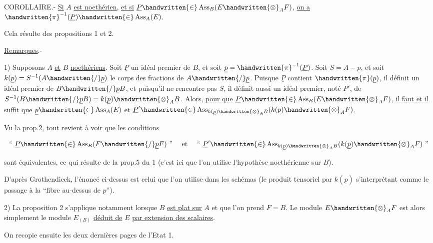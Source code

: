 COROLLAIRE.- \uline{Si} $A$ \uline{est noethérien}, \uline{et si} $\underline P\handwritten{\in}\operatorname{Ass}_B(E\handwritten{\otimes}_A F)$, \uline{on a} $\handwritten{\pi}^{-1}(\underline P)\handwritten{\in}\operatorname{Ass}_A(E)$.

Cela résulte des propositions 1 et 2.

\uline{Remarques}.-

1) Supposons $A$ \uline{et} $B$ \uline{noethériens}. Soit $\underline P$ un idéal premier de $B$, et soit $\underline p=\handwritten{\pi}^{-1}(\underline P)$. Soit $S=A-\underline p$, et soit $k(\underline p)=S^{-1}(A\handwritten{/}\underline p)$ le corps des fractions de $A\handwritten{/}\underline p$. Puisque $\underline P$ contient $\handwritten{\pi}(\underline p)$, il définit un idéal premier de $B\handwritten{/}\underline p B$, et puisqu'il ne rencontre pas $S$, il définit aussi un idéal premier, noté $\underline P'$, de $S^{-1}(B\handwritten{/}\underline p B)=k(\underline p)\handwritten{\otimes}_A B$. Alors, \uline{pour que} $\underline P\handwritten{\in}\operatorname{Ass}_B(E\handwritten{\otimes}_A F)$, \uline{il faut et il suffit que} $\underline p\handwritten{\in}\operatorname{Ass}_A(E)$ \uline{et} $\underline P'\handwritten{\in}\operatorname{Ass}_{k(\underline p)\handwritten{\otimes}_A B}(k(\underline p)\handwritten{\otimes}_A F)$.

Vu la prop.2, tout revient à voir que les conditions

\[
\text{`` }\underline P\handwritten{\in}\operatorname{Ass}_B(F\handwritten{/}\underline p F)\text{ '' \quad et \quad `` }\underline P'\handwritten{\in}\operatorname{Ass}_{k(\underline p)\handwritten{\otimes}_A B}(k(\underline p)\handwritten{\otimes}_A F)\text{ ''}
\]

sont équivalentes, ce qui résulte de la prop.5 du \handwritten{\S} 1 (c'est ici que l'on utilise l'hypothèse noethérienne sur $B$).

\handwritten{[}D'après Grothendieck, l'énoncé ci-dessus est celui que l'on utilise dans les schémas (le produit tensoriel par $k(\underline p)$ s'interprétant comme le passage à la ``fibre au-dessus de $\underline p$'').\handwritten{]}

2) La proposition 2 s'applique notamment lorsque $B$ \uline{est plat sur} $A$ et que l'on prend $F=B$. Le module $E\handwritten{\otimes}_A F$ est alors simplement le module $E_{(B)}$ \uline{déduit de} $E$ \uline{par extension des scalaires}.

On recopie ensuite les deux dernières pages de l'Etat 1.

